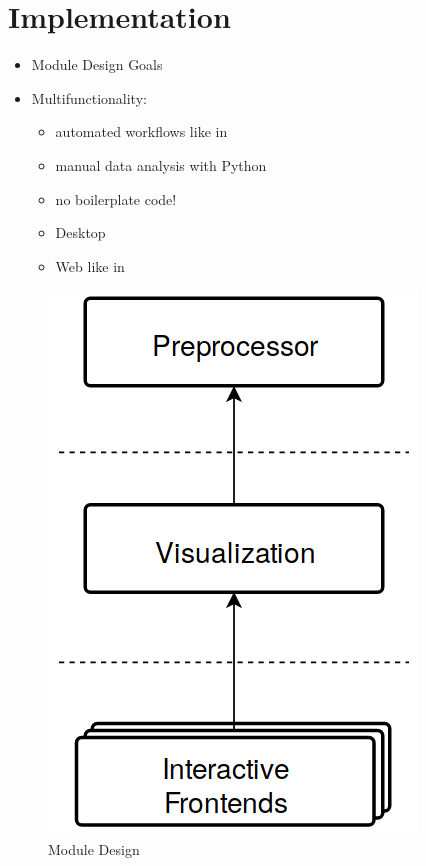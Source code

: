 
\chapter{Implementation}
\label{chap:implementation}


\begin{itemize}
\item Module Design Goals
\item Multifunctionality:
    \begin{itemize}            
    \item automated workflows like in \logoAiida{}
    \item manual data analysis with Python
    \end{itemize}
    \begin{itemize}
    \item no boilerplate code!
    \end{itemize}
    \begin{itemize}
    \item Desktop \faDesktop{}
    \item Web \faServer{} \faArrowRight{} \faGlobe{} like in \logoAiidalab{}
    \end{itemize}
\end{itemize}

\begin{figure}[htb!]
    \centering
    \includegraphics[width=0.3\linewidth]{img/module_design.png}
    \caption{Module Design}
    \label{fig:modules}
\end{figure}



